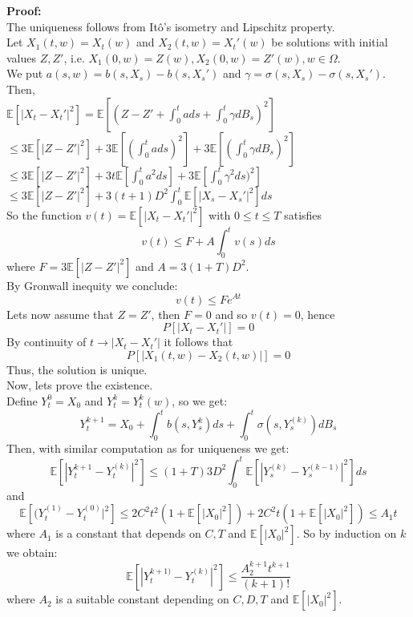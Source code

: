\documentclass[a4paper]{report}
\begin{document}
\begin{itemize}
\textbf{Proof:}\\
The uniqueness follows from Itô's isometry and Lipschitz property.\\
Let $X_1(t,w)=X_t(w)$ and $X_2(t,w)=X_t'(w)$ be solutions with initial values $Z,Z'$, i.e. $X_1(0,w)=Z(w), X_2(0,w)=Z'(w), w\in \Omega$.\\
We put $a(s,w) = b(s,X_s)-b(s,X_s')$ and $\gamma = \sigma(s,X_s)-\sigma(s,X_s')$. Then,\\
$\mathbb{E} [|X_t-X_t'|^2] = \mathbb{E} [(Z-Z' + \int_0^t ads + \int_0^t \gamma dB_s)^2]$\\
$\leq 3\mathbb{E} [|Z-Z'|^2] + 3\mathbb{E}[(\int_0^t ads)^2] + 3 \mathbb{E}[(\int_0^t \gamma dB_s)^2]$\\
$\leq 3\mathbb{E} [|Z-Z'|^2] +3t\mathbb{E} [\int_0^t a^2 ds] + 3\mathbb{E}[\int_0^t \gamma^2 ds)^2]$\\
$\leq 3\mathbb{E} [|Z-Z'|^2] +3(t+1)D^2 \int_0^t \mathbb{E} [|X_s-X_s'|^2]ds$\\
\newline
So the function $v(t) = \mathbb{E}[|X_t-X_t'|^2]$ with $0\leq t\leq T$ satisfies
\begin{equation}
v(t) \leq F+A\int_0^t v(s) ds
\end{equation}
where $F=3\mathbb{E} [|Z-Z'|^2]$ and $A=3(1+T)D^2$.\\
By Gronwall inequity we conclude:
\begin{equation}
v(t) \leq F e^{At}
\end{equation}
Lets now assume that $Z=Z'$, then $F=0$ and so $v(t)=0$, hence
\begin{equation}
P[|X_t-X_t'|]=0
\end{equation}
By continuity of $t\longrightarrow|X_t-X_t'|$ it follows that 
\begin{equation}
P[|X_1(t,w) - X_2(t,w)|]=0
\end{equation}
Thus, the solution is unique.\\
Now, lets prove the existence.\\
Define $Y_t^{0}=X_0$ and $Y_t^{k}=Y_t^{k}(w)$, so we get:
\begin{equation}
Y_t^{k+1} = X_0+\int_0^t b(s,Y_s^{k})ds + \int_0^t \sigma(s,Y_s^{(k)})dB_s
\end{equation}
Then, with similar computation as for uniqueness we get:
\begin{equation}
\mathbb{E}[|Y_t^{k+1}-Y_t^{(k)}|^2]\leq (1+T)3D^2\int_0^t \mathbb{E}[|Y_s^{(k)} - Y_s^{(k-1)}|^2]ds
\end{equation}
and
\begin{equation}
\mathbb{E}[(Y_t^{(1)}-Y_t^{(0)}|^2] \leq 2C^2t^2(1+\mathbb{E}[|X_0|^2])+2C^2t(1+\mathbb{E}[|X_0|^2]) \leq A_1 t
\end{equation}
where $A_1$ is a constant that depends on $C,T$ and $\mathbb{E}[|X_0|^2]$. So by induction on $k$ we obtain:
\begin{equation}
\mathbb{E} [|Y_t^{k+1)}-Y_t^{(k)}|^2] \leq \frac{A_2^{k+1}t^{k+1}}{(k+1)!}
\end{equation}
where $A_2$ is a suitable constant depending on $C,D,T$ and $\mathbb{E}[|X_0|^2]$.


\end{itemize}
\end{document}
